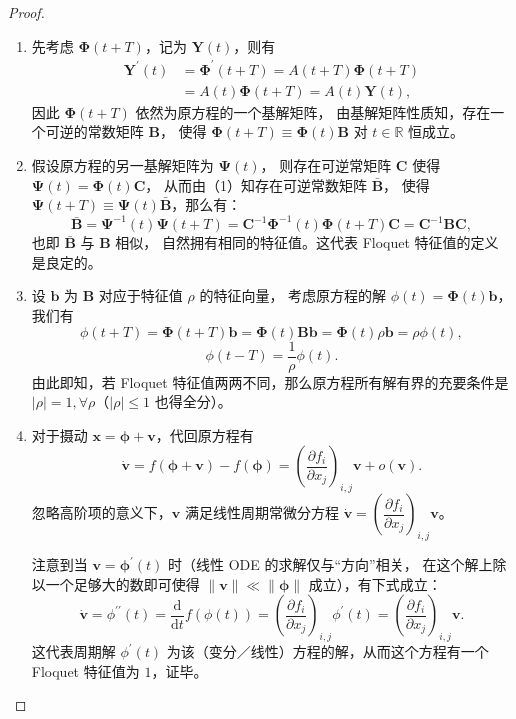 \begin{proof}
\begin{enumerate}[label=(\arabic*)]
\item 先考虑 $\boldsymbol{\Phi}(t+T)$，记为 $\boldsymbol{Y}(t)$，则有
\begin{align*}
\boldsymbol{Y}^{\prime}(t)
&=\boldsymbol{\Phi}^{\prime}(t+T)=A(t+T) \boldsymbol{\Phi}(t+T)\\
&=A(t) \boldsymbol{\Phi}(t+T)=A(t) \boldsymbol{Y}(t),
\end{align*}
因此 $\boldsymbol{\Phi}(t+T)$ 依然为原方程的一个基解矩阵，
由基解矩阵性质知，存在一个可逆的常数矩阵 $\boldsymbol{B}$，
使得 $\boldsymbol{\Phi}(t+T) \equiv \boldsymbol{\Phi}(t) \boldsymbol{B}$ 对 $t \in \mathbb{R}$ 恒成立。

\item 假设原方程的另一基解矩阵为 $\boldsymbol{\Psi}(t)$，
则存在可逆常矩阵 $\boldsymbol{C}$ 使得 $\boldsymbol{\Psi}(t)=\boldsymbol{\Phi}(t) \boldsymbol{C}$，
从而由（1）知存在可逆常数矩阵 $\bar{\boldsymbol{B}}$，
使得 $\boldsymbol{\Psi}(t+T) \equiv \boldsymbol{\Psi}(t) \bar{\boldsymbol{B}}$，那么有：
\[\bar{\boldsymbol{B}}=\boldsymbol{\Psi}^{-1}(t) \boldsymbol{\Psi}(t+T)
=\boldsymbol{C}^{-1} \boldsymbol{\Phi}^{-1}(t) \boldsymbol{\Phi}(t+T) \boldsymbol{C}
=\boldsymbol{C}^{-1} \boldsymbol{B} \boldsymbol{C},\]
也即 $\bar{\boldsymbol{B}}$ 与 $\boldsymbol{B}$ 相似，
自然拥有相同的特征值。这代表 Floquet 特征值的定义是良定的。

\item 设 $\boldsymbol{b}$ 为 $\boldsymbol{B}$ 对应于特征值 $\rho$ 的特征向量，
考虑原方程的解 $\phi(t)=\boldsymbol{\Phi}(t) \boldsymbol{b}$，我们有
\[\phi(t+T)=\boldsymbol{\Phi}(t+T) \boldsymbol{b}
=\boldsymbol{\Phi}(t) \boldsymbol{B} \boldsymbol{b}
=\boldsymbol{\Phi}(t) \rho \boldsymbol{b}=\rho \phi(t),\]
\[\phi(t-T)=\frac{1}{\rho} \phi(t).\]
由此即知，若 Floquet 特征值两两不同，那么原方程所有解有界的充要条件是 $|\rho|=1, \forall \rho$（$|\rho| \leq 1$ 也得全分）。

\item 对于摄动 $\boldsymbol{x}=\boldsymbol{\phi}+\boldsymbol{v}$，代回原方程有
\[\dot{\boldsymbol{v}}=f(\boldsymbol{\phi}+\boldsymbol{v})-f(\boldsymbol{\phi})
=\left(\frac{\partial f_{i}}{\partial x_{j}}\right)_{i,j} \boldsymbol{v}+o(\boldsymbol{v}).\]
忽略高阶项的意义下，$\boldsymbol{v}$ 满足线性周期常微分方程
$\dot{\boldsymbol{v}}=\left(\dfrac{\partial f_{i}}{\partial x_{j}}\right)_{i,j} \boldsymbol{v}$。

注意到当 $\boldsymbol{v}=\boldsymbol{\phi}^{\prime}(t)$ 时（线性 ODE 的求解仅与``方向''相关，
在这个解上除以一个足够大的数即可使得 $\|\boldsymbol{v}\|\ll\|\boldsymbol{\phi}\|$ 成立），有下式成立：
\[\dot{\boldsymbol{v}}=\phi^{\prime \prime}(t)=\frac{\mathrm{d}}{\mathrm{d}t} f(\phi(t))
=\left(\frac{\partial f_{i}}{\partial x_{j}}\right)_{i,j} \phi^{\prime}(t)
=\left(\frac{\partial f_{i}}{\partial x_{j}}\right)_{i,j} \boldsymbol{v}.\]
这代表周期解 $\phi^{\prime}(t)$ 为该（变分／线性）方程的解，从而这个方程有一个 Floquet 特征值为 $1$，证毕。\qedhere
\end{enumerate}
\end{proof}

